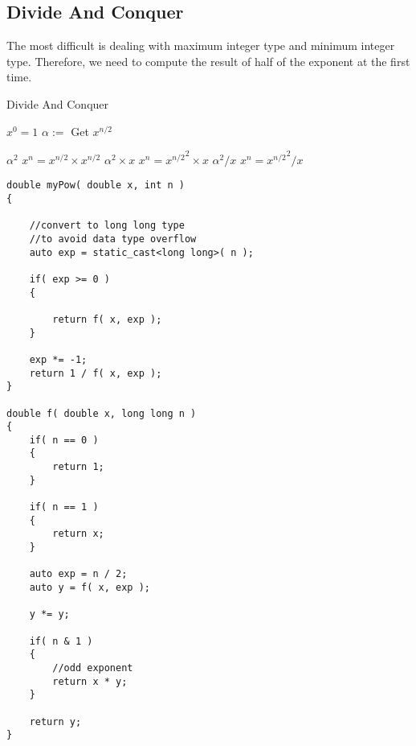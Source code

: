 \subsection{Divide And Conquer}
The most difficult is dealing with maximum integer type and minimum integer type. Therefore, we need to compute the result of half of the exponent at the first time.
\setcounter{algorithm}{0}
\begin{algorithm}[H]
\caption{Divide And Conquer}
\begin{algorithmic}[1]
\State {} \Comment $x^0 = 1$
\EndIf
\State $\alpha :=$  \Comment Get $x^{n/2}$
\end{algorithmic}
\end{algorithm}
\begin{algorithm}[H]
\begin{algorithmic}[1]
\State \Return $\alpha^2$ \Comment $x^n = x^{n/2} \times x^{n/2}$
\State \Return $\alpha^2\times x$ \Comment $x^n = {x^{n/2}}^2\times x$
\Else
\State \Return $\alpha^2 / x$ \Comment $x^n = {x^{n/2}}^2 / x$
\EndIf
\EndProcedure
\end{algorithmic}
\end{algorithm}

\setcounter{lstlisting}{0}
\begin{lstlisting}[style=customc, caption={Divide And Conquer}]
double myPow( double x, int n )
{

    //convert to long long type
    //to avoid data type overflow
    auto exp = static_cast<long long>( n );

    if( exp >= 0 )
    {

        return f( x, exp );
    }

    exp *= -1;
    return 1 / f( x, exp );
}

double f( double x, long long n )
{
    if( n == 0 )
    {
        return 1;
    }

    if( n == 1 )
    {
        return x;
    }

    auto exp = n / 2;
    auto y = f( x, exp );

    y *= y;

    if( n & 1 )
    {
        //odd exponent
        return x * y;
    }

    return y;
}
\end{lstlisting}



